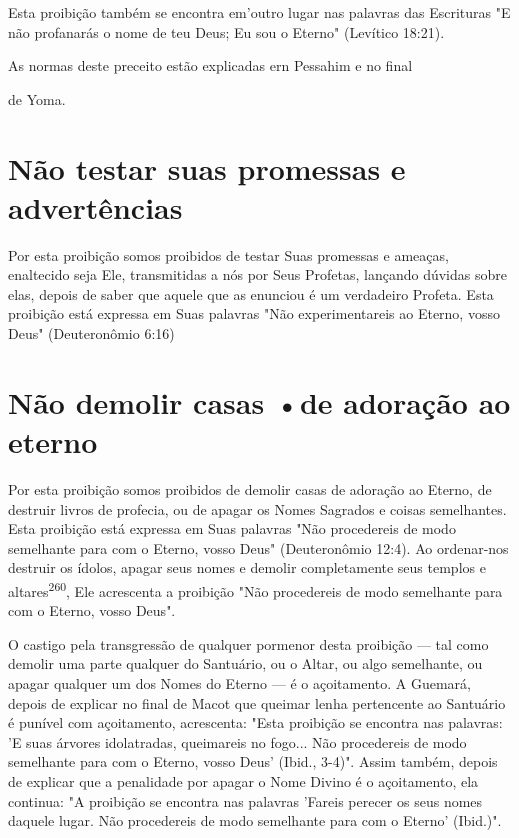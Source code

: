 \begin{itemize}
\begin{enumrate}
\begin{itemize}
\begin{itemize}
\begin{itemize}
Esta proibição também se encontra em'outro lugar nas palavras das
Escrituras "E não profanarás o nome de teu Deus; Eu sou o Eterno"
(Levítico 18:21).


As normas deste preceito estão explicadas ern Pessahim e no final


de Yoma.

\section{Não testar suas promessas e advertências}

Por esta proibição somos proibidos de testar Suas promessas e amea­ças,
enaltecido seja Ele, transmitidas a nós por Seus Profetas, lançando
dúvidas sobre elas, depois de saber que aquele que as enunciou é um
verdadeiro Profe­ta. Esta proibição está expressa em Suas palavras "Não
experimentareis ao Eter­no, vosso Deus" (Deuteronômio 6:16)

\section{Não demolir casas •de adoração ao eterno}

Por esta proibição somos proibidos de demolir casas de adoração ao
Eterno, de destruir livros de profecia, ou de apagar os Nomes Sagrados e
coisas semelhantes. Esta proibição está expressa em Suas palavras "Não
proce­dereis de modo semelhante para com o Eterno, vosso Deus"
(Deuteronômio 12:4). Ao ordenar-nos destruir os ídolos, apagar seus
nomes e demolir comple­tamente seus templos e
altares\textsuperscript{260}, Ele acrescenta a proibição "Não
procedereis de modo semelhante para com o Eterno, vosso Deus".

O castigo pela transgressão de qualquer pormenor desta proibição --- tal
como demolir uma parte qualquer do Santuário, ou o Altar, ou algo
se­melhante, ou apagar qualquer um dos Nomes do Eterno --- é o
açoitamento. A Guemará, depois de explicar no final de Macot que queimar
lenha pertencen­te ao Santuário é punível com açoitamento, acrescenta:
"Esta proibição se en­contra nas palavras: 'E suas árvores idolatradas,
queimareis no fogo... Não pro­cedereis de modo semelhante para com o
Eterno, vosso Deus' (Ibid., 3-4)". As­sim também, depois de explicar que
a penalidade por apagar o Nome Divino é o açoitamento, ela continua: "A
proibição se encontra nas palavras 'Fareis perecer os seus nomes daquele
lugar. Não procedereis de modo semelhante para com o Eterno' (Ibid.)".



\end{itemize}
\end{itemize}
\end{itemize}
\end{enumrate}
\end{itemize}
